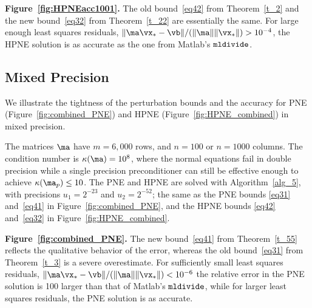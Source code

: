 \documentclass[final]{siamart220329}%
\begin{document}
\textbf{Figure~\ref{fig:HPNEacc1001}.}
The old bound~\eqref{eq42} from Theorem~\ref{t_2} and the new bound~\eqref{eq32} from Theorem~\ref{t_22} are essentially the same. 
For large enough least squares residuals,
$\|\ma\vx_*-\vb\|/(\|\ma\|\|\vx_*\|)>10^{-4}$, the HPNE 
solution is as accurate as the one from Matlab's $\verb|mldivide|$. 




\subsection{Mixed Precision}\label{exp_accuracy}
We illustrate the tightness of the perturbation bounds 
and the accuracy for
PNE (Figure~\ref{fig:combined_PNE}) and
HPNE (Figure~\ref{fig:HPNE_combined}) in mixed precision.

The matrices $\ma$ have $m=6,000$ rows, and
$n=100$ or $n=1000$ columns. The condition number is $\kappa(\ma)=10^8$, where the normal equations fail in double precision while a single precision preconditioner can still be effective enough to achieve $\kappa(\ma_p)\leq 10$.   
The PNE and HPNE are solved with Algorithm~\ref{alg_5},
with 
precisions $u_1=2^{-23}$ and $u_2=2^{-52}$;  the same as
the PNE bounds \eqref{eq31} and~\eqref{eq41} in Figure~\ref{fig:combined_PNE}, and the HPNE bounds \eqref{eq42} and~\eqref{eq32} in Figure~\ref{fig:HPNE_combined}.


\textbf{Figure~\ref{fig:combined_PNE}.} 
The new bound~\eqref{eq41} from Theorem~\ref{t_55} 
reflects the qualitative behavior of the error, whereas the old bound~\eqref{eq31} from Theorem~\ref{t_3} is a severe overestimate.
For sufficiently small least squares residuals, 
$\|\ma\vx_*-\vb\|/(\|\ma\|\|\vx_*\|)<10^{-6}$
the relative error
in the PNE solution is 100 larger than that 
of  Matlab's $\verb|mldivide|$,
while for larger least squares residuals, the 
PNE solution is as accurate.
\end{document}
